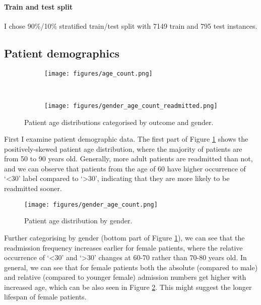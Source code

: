 \documentclass[10pt, twocolumn]{article}
\begin{document}
\paragraph{Train and test split} I chose 90\%/10\% stratified train/test split with 7149 train and 795 test instances.

\subsection{Patient demographics}

\begin{figure}
	\centering
	\begin{subfigure}[t]{0.5\textwidth}
        \centering
        \texttt{[image: figures/age\_count.png]}
	\end{subfigure}
	~
	\begin{subfigure}[t]{0.5\textwidth}
        \centering
		\texttt{[image: figures/gender\_age\_count\_readmitted.png]}
    \end{subfigure}
	\caption{Patient age distributions categorised by outcome and gender.}\label{genderagecountreadmitted}
\end{figure}

First I examine patient demographic data. The first part of Figure \ref{genderagecountreadmitted} shows the positively-skewed patient age distribution, where the majority of patients are from 50 to 90 years old. Generally, more adult patients are readmitted than not, and we can observe that patients from the age of 60 have higher occurrence of `<30' label compared to `>30', indicating that they are more likely to be readmitted sooner.

\begin{figure}
	\centering
	\texttt{[image: figures/gender\_age\_count.png]}
	\caption{Patient age distribution by gender.}\label{genderagecount}
\end{figure}

Further categorising by gender (bottom part of Figure \ref{genderagecountreadmitted}), we can see that the readmission frequency increases earlier for female patients, where the relative occurrence of `<30' and `>30' changes at 60-70 rather than 70-80 years old. In general, we can see that for female patients both the absolute (compared to male) and relative (compared to younger female) admission numbers get higher with increased age, which can be also seen in Figure \ref{genderagecount}. This might suggest the longer lifespan of female patients.
\end{document}
